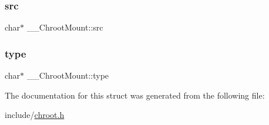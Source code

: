\mbox{\label{struct_____chroot_mount_a1853f747ee2cf7e6e33d34d8c5d598d6}} 
\subsubsection{\texorpdfstring{src}{src}}
{\footnotesize\ttfamily char$\ast$ \+\_\+\+\_\+\+Chroot\+Mount\+::src}

\mbox{\label{struct_____chroot_mount_a184d760509dc0e1b485124d2f31d6889}} 
\subsubsection{\texorpdfstring{type}{type}}
{\footnotesize\ttfamily char$\ast$ \+\_\+\+\_\+\+Chroot\+Mount\+::type}



The documentation for this struct was generated from the following file\+:\begin{DoxyCompactItemize}
\item 
include/\mbox{\hyperlink{chroot_8h}{chroot.\+h}}\end{DoxyCompactItemize}
